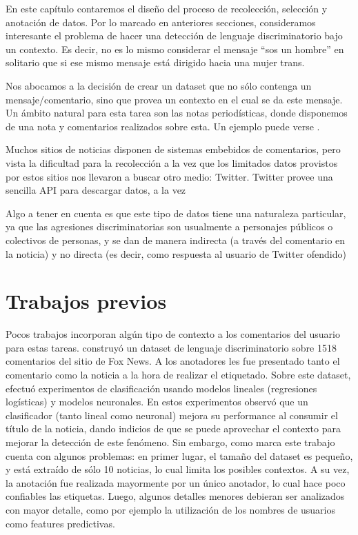 \label{chap:dataset_creation}

En este capítulo contaremos el diseño del proceso de recolección, selección y anotación de datos. Por lo marcado en anteriores secciones, consideramos interesante el problema de hacer una detección de lenguaje discriminatorio bajo un contexto. Es decir, no es lo mismo considerar el mensaje ``sos un hombre'' en solitario que si ese mismo mensaje está dirigido hacia una mujer trans.

Nos abocamos a la decisión de crear un dataset que no sólo contenga un mensaje/comentario, sino que provea un contexto en el cual se da este mensaje. Un ámbito natural para esta tarea son las notas periodísticas, donde disponemos de una nota y comentarios realizados sobre esta. Un ejemplo puede verse .

Muchos sitios de noticias disponen de sistemas embebidos de comentarios, pero vista la dificultad para la recolección a la vez que los limitados datos provistos por estos sitios nos llevaron a buscar otro medio: Twitter. Twitter provee una sencilla API para descargar datos, a la vez

Algo a tener en cuenta es que este tipo de datos tiene una naturaleza particular, ya que las agresiones discriminatorias son usualmente a personajes públicos o colectivos de personas, y se dan de manera indirecta (a través del comentario en la noticia) y no directa (es decir, como respuesta al usuario de Twitter ofendido)

\section{Trabajos previos}
\label{sec:dataset_previous}

Pocos trabajos incorporan algún tipo de contexto a los comentarios del usuario para estas tareas. \citet{gao-huang-2017-detecting} construyó un dataset de lenguaje discriminatorio sobre 1518 comentarios del sitio de Fox News. A los anotadores les fue presentado tanto el comentario como la noticia a la hora de realizar el etiquetado. Sobre este dataset, efectuó experimentos de clasificación usando modelos lineales (regresiones logísticas) y modelos neuronales. En estos experimentos observó que un clasificador (tanto lineal como neuronal) mejora su performance al consumir el título de la noticia, dando indicios de que se puede aprovechar el contexto para mejorar la detección de este fenómeno. Sin embargo, como marca \citet{pavlopoulos2020toxicity} este trabajo cuenta con algunos problemas: en primer lugar, el tamaño del dataset es pequeño, y está extraído de sólo 10 noticias, lo cual limita los posibles contextos. A su vez, la anotación fue realizada mayormente por un único anotador, lo cual hace poco confiables las etiquetas. Luego, algunos detalles menores debieran ser analizados con mayor detalle, como por ejemplo la utilización de los nombres de usuarios como features predictivas.

